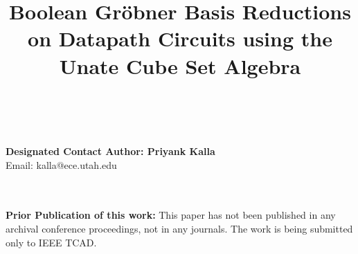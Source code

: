 \documentclass[conference, onecolumn]{IEEEtran}
\begin{document}



\title{\Large \sc 
Boolean Gr\"obner Basis Reductions on Datapath Circuits using the Unate Cube Set Algebra
}

\author{


\ \\
}

\maketitle
\begin{center}
{\bf Designated Contact Author: Priyank Kalla}\\
Email: kalla@ece.utah.edu\\
\end{center}

\ \\
\ \\
{\bf Prior Publication of this work:} This paper has not been
published in any archival conference proceedings, not in any
journals. The work is being submitted only to IEEE TCAD. 








\end{document}
